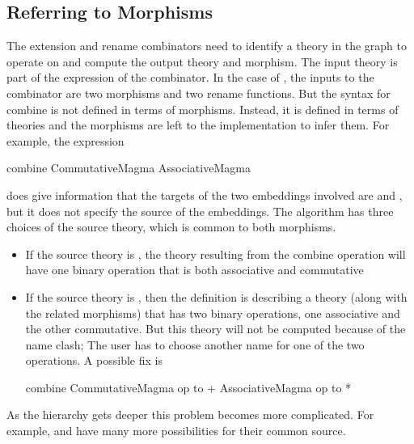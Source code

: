 \subsection{Referring to Morphisms}
\label{subsec:overPart}
The extension and rename combinators need to identify a theory in the graph to operate on and compute the output theory and morphism. The input theory is part of the expression of the combinator. 
In the case of , the inputs to the combinator are two morphisms and two rename functions. But the syntax for combine is not defined in terms of morphisms. Instead, it is defined in terms of theories and the morphisms are left to the implementation to infer them. 
For example, the expression 
\begin{togcode}
combine CommutativeMagma {} AssociativeMagma {}
\end{togcode}
\noindent does give information that the targets of the two embeddings involved are  and , but it does not specify the source of the embeddings. The algorithm has three choices of the source theory, which is common to both morphisms. 
\begin{itemize}
    \item If the source theory is , the theory resulting from the combine operation will have one binary operation that is both associative and commutative 
    \item If the source theory is , then the definition is describing a theory (along with the related morphisms) that has two binary operations, one associative and the other commutative. But this theory will not be computed because of the name clash; The user has to choose another name for one of the two operations. A possible fix is 
    \begin{togcode}
combine CommutativeMagma {op to +} AssociativeMagma {op to *}
    \end{togcode}
\end{itemize}
As the hierarchy gets deeper this problem becomes more complicated. For example,  and  have many more possibilities for their common source. 

